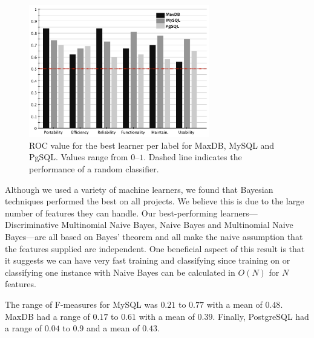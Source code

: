 \documentclass[smallextended]{svjour3}       %
\begin{document}
\begin{figure}[t]
\centering
\includegraphics[width=0.7\textwidth]{figures/both-supervised}
\caption[]{ROC value for the best learner per label for MaxDB, MySQL and PgSQL. Values range from $0$--$1$.  Dashed line indicates the performance of a random
classifier.
}
\label{fig:best-learn-per-tag}
\end{figure}

Although we used a variety of machine learners, we found that Bayesian techniques performed the best on all projects. We believe this is due to the large number of features they can handle.
Our best-performing learners---Discriminative Multinomial Naive Bayes, Naive Bayes
and Multinomial Naive Bayes---are all based on Bayes' theorem and all make the naive assumption
that the features supplied are independent. 
One beneficial aspect of this result is that it suggests we can have
very fast training and classifying  since training on or classifying one
instance with Naive Bayes can be calculated in $O(N)$
for $N$ features.


The range of F-measures for MySQL was $0.21$ to $0.77$ with a mean
of $0.48$. MaxDB had a range of $0.17$ to $0.61$ with a mean
of $0.39$. Finally, PostgreSQL had a range of $0.04$ to $0.9$ and a mean of $0.43$.
\end{document}

